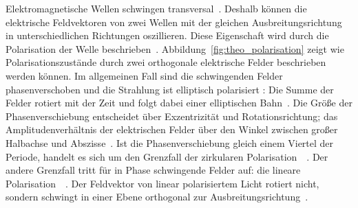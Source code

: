 \documentclass[a4paper,12pt,twoside,parskip=no,headsepline,open=right,ngerman,export]{scrreprt}
\begin{document}
            Elektromagnetische Wellen schwingen transversal~\cite{gil_polarized_2016}. Deshalb können die elektrische Feldvektoren von zwei Wellen mit der gleichen Ausbreitungsrichtung in unterschiedlichen Richtungen oszillieren. Diese Eigenschaft wird durch die Polarisation der Welle beschrieben~\cite{gil_polarized_2016}. Abbildung~\ref{fig:theo_polarisation} zeigt wie Polarisationszustände durch zwei orthogonale elektrische Felder beschrieben werden können. Im allgemeinen Fall sind die schwingenden Felder phasenverschoben und die Strahlung ist elliptisch polarisiert : Die Summe der Felder rotiert mit der Zeit und folgt dabei einer elliptischen Bahn~\cite{gil_polarized_2016}. Die Größe der Phasenverschiebung entscheidet über Exzentrizität und Rotationsrichtung; das Amplitudenverhältnis der elektrischen Felder über den Winkel zwischen großer Halbachse und Abszisse~\cite{gil_polarized_2016}. Ist die Phasenverschiebung gleich einem Viertel der Periode, handelt es sich um den Grenzfall der zirkularen Polarisation~~\cite{gil_polarized_2016}. Der andere Grenzfall tritt für in Phase schwingende Felder auf: die lineare Polarisation~~\cite{gil_polarized_2016}. Der Feldvektor von linear polarisiertem Licht rotiert nicht, sondern schwingt in einer Ebene orthogonal zur Ausbreitungsrichtung~\cite{gil_polarized_2016}.
            
\end{document}
